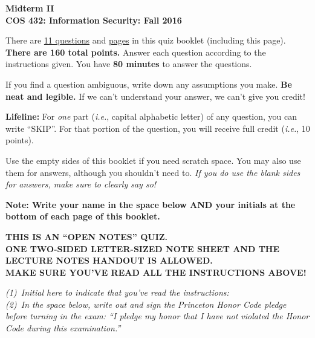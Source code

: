 \documentclass[11pt]{article}
\newcommand{\ie}{{\em i.e.}}
\newcounter{answer}
\begin{document}
\begin{center}
{\LARGE{\bf Midterm II}} \\
\vspace{.15in}
{\Large{\bf COS 432: Information Security: Fall 2016}} \\
\vspace{.2in}

\begin{boxedminipage}[h]{6in}
  There are \underline{11 questions} and \underline{\pageref{lastpage}
    pages} in this quiz booklet (including this page). {\bf There are
    160 total points.}  Answer each question according to the
  instructions given.  You have {\bf 80 minutes} to answer the
  questions.

\vspace{.1in} 
If you find a question ambiguous, write down any
assumptions you make.  {\bf Be neat and legible.}  If we can't
understand your answer, we can't give you credit!  

\vspace*{.1in} {\bf Lifeline:} For {\em one} part (\ie, capital alphabetic
letter) of any question, you can write ``SKIP''. For that portion of the
question, you will receive full credit (\ie, 10 points).

\vspace{.1in} 
Use the empty sides of this booklet if you need scratch space.  You
may also use them for answers, although you shouldn't need to.  {\em If you
do use the blank sides for answers, make sure to clearly say so!}

\vspace{.1in} 
{\bf Note: Write your name in the space below AND your initials at the bottom of each
page of this booklet.}

\begin{center}{\bf THIS IS AN ``OPEN NOTES'' QUIZ.\\
ONE TWO-SIDED LETTER-SIZED NOTE SHEET AND THE LECTURE NOTES HANDOUT IS
ALLOWED. \\ 
MAKE SURE YOU'VE READ ALL THE INSTRUCTIONS ABOVE!}
\end{center}
{\em (1)~Initial here to indicate that you've read the instructions: \\ 
(2)~In the space below, write out and sign the Princeton Honor Code pledge before 
turning in the exam: ``I pledge my honor that I have not violated the Honor Code during this examination.'' }
\vspace{0.5in}
\\



\end{boxedminipage}
\end{center}
\end{document}
